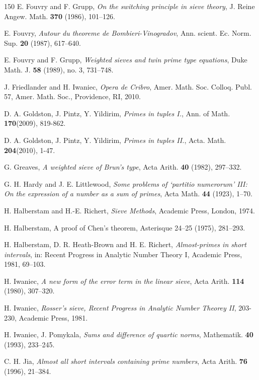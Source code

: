 \documentclass[12pt, a4paper]{amsart}
\theoremstyle{plain}
\theoremstyle{remark}
\numberwithin{equation}{section}
\begin{document}
\begin{thebibliography}{150}
		E. Fouvry and F. Grupp,
		\emph{On the switching principle in sieve theory},
		J. Reine Angew. Math. {\bf 370} (1986), 101--126.
		
		E. Fouvry,
		\emph{Autour du theoreme de Bombieri-Vinogradov},
		Ann. scient. Ec. Norm. Sup. {\bf 20} (1987), 617--640.
		
		E. Fouvry and F. Grupp,
		\emph{Weighted sieves and twin prime type equations}, 
		Duke Math. J. {\bf 58} (1989), no. 3, 731--748.
		
		J. Friedlander and H. Iwaniec,
		\emph{Opera de Cribro},
		Amer. Math. Soc. Colloq. Publ. 57, Amer. Math. Soc., Providence, RI, 2010.
		
		D. A. Goldston, J. Pintz, Y. Yildirim,
		\emph{Primes in tuples I.},
		Ann. of Math. {\bf 170}(2009), 819-862.
		
		D. A. Goldston, J. Pintz, Y. Yildirim,
		\emph{Primes in tuples II.},
		Acta. Math. {\bf 204}(2010), 1-47.
		
		G. Greaves,
		\emph{A weighted sieve of Brun's type}, Acta Arith. {\bf 40} (1982), 297--332.
		
		G. H. Hardy and J. E. Littlewood,
		\emph{Some problems of `partitio numerorum' III: On the expression of a number as a sum of primes},
		Acta Math. {\bf 44} (1923), 1--70.
		
		H. Halberstam and H.-E. Richert,
		\emph{Sieve Methods},
		Academic Press, London, 1974.
		
		 H. Halberstam, A proof of Chen's theorem, Asterisque 24--25 (1975), 281--293.
		
		H. Halberstam, D. R. Heath-Brown and H. E. Richert,
		\emph{Almost-primes in short intervals},
		in: Recent Progress in Analytic Number Theory I, Academic Press, 1981, 69--103.
		
		 H. Iwaniec, 
		\emph{A new form of the error term in the linear sieve}, Acta Arith. {\bf 114} (1980), 307--320.
		
		 H. Iwaniec, 
		\emph{Rosser's sieve, Recent Progress in Analytic Number Theorey II}, 203-230, Academic Press, 1981.
		
		 H. Iwaniec, J. Pomykala,
		\emph{Sums and difference of quartic norms}, Mathematik. {\bf 40} (1993), 233--245.
		
 C. H. Jia, 
\emph{Almost all short intervals containing prime numbers}, Acta Arith. {\bf 76} (1996), 21--384.
		

\end{thebibliography}
\end{document}

